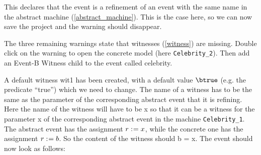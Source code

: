 
 This declares that the event is a refinement of an event with the same name in the abstract machine (\ref{abstract_machine}). This is the case here, so we can now save the project and the warning should disappear.


The three remaining warnings state that witnesses (\ref{witness}) are missing. Double click on the warning to open the concrete model (here \texttt{Celebrity\_2}). Then add an \textsf{Event-B Witness} child to the event called \textsf{celebrity}.

A default witness \textsf{wit1} has been created, with a default value \textsf{$\btrue$} (e.g. the predicate ``true'') which we need to change. The name of a witness has to be the same as the parameter of the corresponding abstract event that it is refining. Here the name of the witness will have to be \textsf{x} so that it can be a witness for the parameter \textsf{x} of the corresponding abstract event in the machine \texttt{Celebrity\_1}. The abstract event has the assignment \textsf{$r \mathrel{:\mkern1mu=} x$}, while the concrete one has the assignment \textsf{$r \mathrel{:\mkern1mu=} b$}. So the content of the witness should \textsf{b = x}. The event should now look as follows: 

\begin{description}
		\begin{description}
		\WhenGrd
			\begin{description}
			\end{description}
		\Witnesses
			\begin{description}
			\nItem{ x }{ b=x }
			\end{description}
		\ThenAct
			\begin{description}
			\nItemX{ act1 }{ r :=  b }
			\end{description}
		\EndAct
		\end{description}
\end{description}

